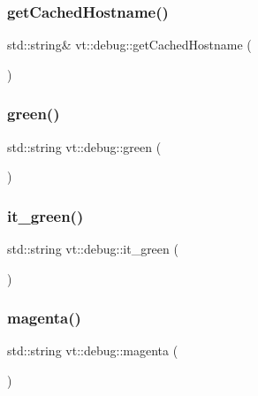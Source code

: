 \subsubsection{\texorpdfstring{get\+Cached\+Hostname()}{getCachedHostname()}}
{\footnotesize\ttfamily std\+::string\& vt\+::debug\+::get\+Cached\+Hostname (\begin{DoxyParamCaption}{ }\end{DoxyParamCaption})\hspace{0.3cm}{\ttfamily [inline]}}

\mbox{\label{namespacevt_1_1debug_ac88d2f3171c5f622861b5c8ea986f281}} 
\subsubsection{\texorpdfstring{green()}{green()}}
{\footnotesize\ttfamily std\+::string vt\+::debug\+::green (\begin{DoxyParamCaption}{ }\end{DoxyParamCaption})\hspace{0.3cm}{\ttfamily [inline]}}

\mbox{\label{namespacevt_1_1debug_a749c31dee324cac600ec442f9f39eb7c}} 
\subsubsection{\texorpdfstring{it\+\_\+green()}{it\_green()}}
{\footnotesize\ttfamily std\+::string vt\+::debug\+::it\+\_\+green (\begin{DoxyParamCaption}{ }\end{DoxyParamCaption})\hspace{0.3cm}{\ttfamily [inline]}}

\mbox{\label{namespacevt_1_1debug_a1617ac1c602fb27518f6ab8fd4bf99c1}} 
\subsubsection{\texorpdfstring{magenta()}{magenta()}}
{\footnotesize\ttfamily std\+::string vt\+::debug\+::magenta (\begin{DoxyParamCaption}{ }\end{DoxyParamCaption})\hspace{0.3cm}{\ttfamily [inline]}}

